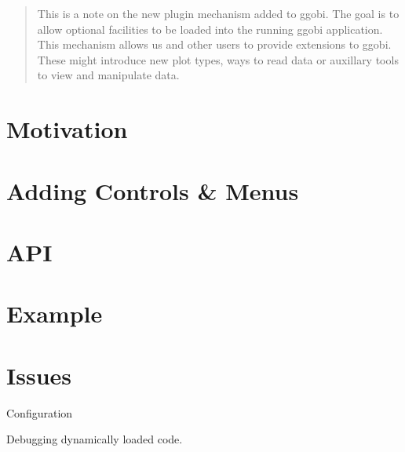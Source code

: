 \documentclass{article}
\begin{document}
\begin{abstract}
  This is a note on the new plugin mechanism added to ggobi. The goal
  is to allow optional facilities to be loaded into the running ggobi
  application.
 This mechanism allows us and other users to provide extensions
 to ggobi. These  might introduce new plot types, ways
 to read data or auxillary tools to view and manipulate
 data.

\end{abstract}

\section{Motivation}

\section{Adding Controls \& Menus}

\section{API}

\section{Example}

\section{Issues}
Configuration

Debugging dynamically loaded code.
\end{document}
